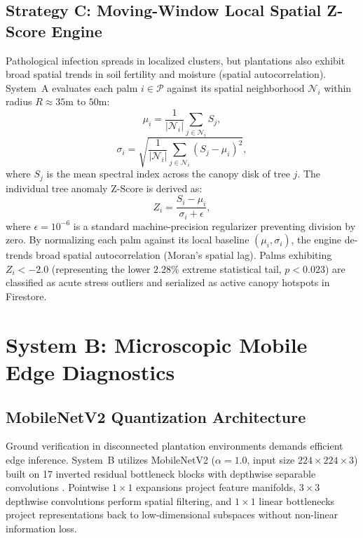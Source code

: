 \documentclass[conference,a4paper]{IEEEtran}
\begin{document}
\subsection{Strategy C: Moving-Window Local Spatial Z-Score Engine}
Pathological infection spreads in localized clusters, but plantations also exhibit broad spatial trends in soil fertility and moisture (spatial autocorrelation). System~A evaluates each palm $i \in \mathcal{P}$ against its spatial neighborhood $\mathcal{N}_i$ within radius $R \approx 35\text{m}$ to $50\text{m}$:
\begin{equation}
\mu_i = \frac{1}{|\mathcal{N}_i|} \sum_{j \in \mathcal{N}_i} S_j,
\label{eq:local_mean}
\end{equation}
\begin{equation}
\sigma_i = \sqrt{\frac{1}{|\mathcal{N}_i|} \sum_{j \in \mathcal{N}_i} (S_j - \mu_i)^2},
\label{eq:local_std}
\end{equation}
where $S_j$ is the mean spectral index across the canopy disk of tree $j$. The individual tree anomaly Z-Score is derived as:
\begin{equation}
Z_i = \frac{S_i - \mu_i}{\sigma_i + \epsilon},
\label{eq:zscore}
\end{equation}
where $\epsilon = 10^{-6}$ is a standard machine-precision regularizer preventing division by zero. By normalizing each palm against its local baseline $(\mu_i, \sigma_i)$, the engine de-trends broad spatial autocorrelation (Moran's spatial lag). Palms exhibiting $Z_i < -2.0$ (representing the lower $2.28\%$ extreme statistical tail, $p < 0.023$) are classified as acute stress outliers and serialized as active canopy hotspots in Firestore.

\section{System B: Microscopic Mobile Edge Diagnostics}

\subsection{MobileNetV2 Quantization Architecture}
Ground verification in disconnected plantation environments demands efficient edge inference. System~B utilizes MobileNetV2 ($\alpha=1.0$, input size $224 \times 224 \times 3$) built on 17 inverted residual bottleneck blocks with depthwise separable convolutions \cite{b10}. Pointwise $1\times1$ expansions project feature manifolds, $3\times3$ depthwise convolutions perform spatial filtering, and $1\times1$ linear bottlenecks project representations back to low-dimensional subspaces without non-linear information loss.
\end{document}
